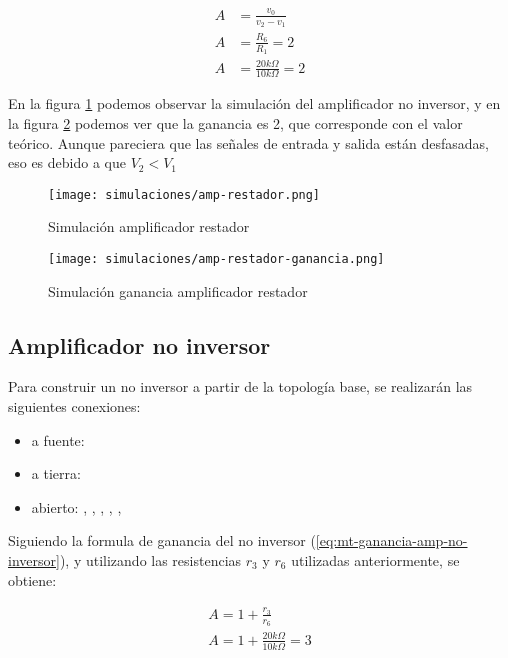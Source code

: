 \begin{align*}
    A &= \frac{v_0}{v_2 - v_1} \\
    A & = \frac{R_6}{R_1} = 2 \\
    A &= \frac{20k\Omega}{10k\Omega} = 2
\end{align*}

En la figura \ref{fig:sim-amp-restador} podemos observar la simulación del amplificador no inversor, y en la figura \ref{fig:sim-amp-restador-ganancia} podemos ver que la ganancia es 2, que corresponde con el valor teórico. Aunque pareciera que las señales de entrada y salida están desfasadas, eso es debido a que $V_2 < V_1$

\begin{figure}[ht]
    \centering
    \texttt{[image: simulaciones/amp-restador.png]}
    \caption{Simulación amplificador restador}
    \label{fig:sim-amp-restador}
\end{figure}

\begin{figure}[ht]
    \centering
    \texttt{[image: simulaciones/amp-restador-ganancia.png]}
    \caption{Simulación ganancia amplificador restador}
    \label{fig:sim-amp-restador-ganancia}
\end{figure}


\FloatBarrier
\subsection{Amplificador no inversor}

Para construir un no inversor a partir de la topología base, se realizarán las siguientes conexiones:

\begin{itemize}
    \item a fuente: 
    \item a tierra: 
    \item abierto: , , , , , 
\end{itemize}

Siguiendo la formula de ganancia del no inversor (\ref{eq:mt-ganancia-amp-no-inversor}), y utilizando las resistencias $r_3$ y $r_6$ utilizadas anteriormente, se obtiene:

\begin{align*}
    A = 1 + \frac{r_3}{r_6} \\
    A = 1 + \frac{20k\Omega}{10k\Omega} = 3
\end{align*}

